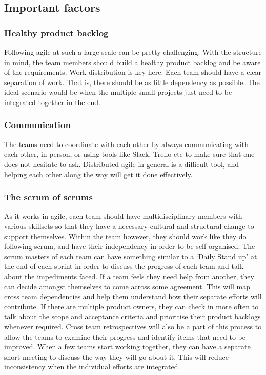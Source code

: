 \documentclass[sigconf]{acmart}
\begin{document}
\subsection{Important factors}

\subsubsection{Healthy product backlog}
Following agile at such a large scale can be pretty challenging. With the structure in mind, the team members should build a healthy product backlog and be aware of the requirements.\cite{SunitP} Work distribution is key here. Each team should have a clear separation of work. That is, there should be as little dependency as possible. The ideal scenario would be when the multiple small projects just need to be integrated together in the end.

\subsubsection{Communication}
The teams need to coordinate with each other by always communicating with each other, in person, or using tools like Slack, Trello etc to make sure that one does not hesitate to ask. Distributed agile in general is a difficult tool, and helping each other along the way will get it done effectively.

\subsubsection{The scrum of scrums}
As it works in agile, each team should have multidisciplinary members with various skillsets so that they have a necessary cultural and structural change to support themselves. Within the team however, they should work like they do following scrum, and have their independency in order to be self organised. The scrum masters of each team can have something similar to a ‘Daily Stand up’ at the end of each sprint in order to discuss the progress of each team and talk about the impediments faced. If a team feels they need help from another, they can decide amongst themselves to come across some agreement. This will map cross team dependencies and help them understand how their separate efforts will contribute. If there are multiple product owners, they can check in more often to talk about the scope and acceptance criteria and prioritise their product backlogs whenever required. Cross team retrospectives will also be a part of this process to allow the teams to examine their progress and identify items that need to be improved. When a few teams start working together, they can have a separate short meeting to discuss the way they will go about it. This will reduce inconsistency when the individual efforts are integrated. 
\end{document}

